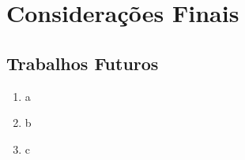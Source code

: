 \chapter[Considerações Finais]{Considerações Finais}

\section{Trabalhos Futuros}

\begin{enumerate}
\item a
    \item b
    \item c
\end{enumerate}
